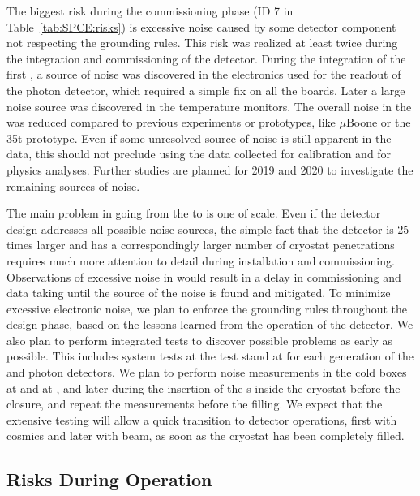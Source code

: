 The biggest risk during the commissioning phase
(ID 7 in Table~\ref{tab:SPCE:risks}) is excessive noise 
caused by some detector component not respecting the  grounding
rules. This risk was realized at least twice during the 
integration and commissioning of the  detector. During the 
integration of the first , a source of noise was discovered 
in the electronics used for the readout of the photon  detector, which 
required a simple fix on all the boards. Later a large noise source was 
discovered in the temperature monitors. The overall noise in the  
was reduced compared to previous  experiments or prototypes, 
like $\mu$Boone or the 35t prototype. Even if some unresolved source of noise 
is still apparent in the  data, this should not preclude using the
data collected for calibration and for physics analyses. Further studies are
planned for 2019 and 2020 to investigate the remaining sources of noise.

The main problem in going from the  to  is one of scale.
Even if the detector design addresses all possible noise sources, the simple
fact that the detector is 25 times larger and has a correspondingly larger
number of cryostat penetrations requires much more attention to detail
during installation and commissioning. Observations of excessive 
noise in  would result in a delay in commissioning and  
data taking until the source of the noise is found and mitigated. To minimize excessive 
electronic noise, we plan to enforce the grounding  rules throughout the 
design phase, based on the lessons learned from the operation of the 
 detector. We also plan to perform  integrated tests to discover 
possible problems as early as possible. This includes system tests at the  test stand at  for each generation 
of the  and photon detectors. We plan to perform noise 
measurements in the cold boxes at  and at , and later 
during the insertion of the s inside the cryostat before the 
 closure, and repeat the measurements before the  filling. 
We expect that the extensive testing will allow a quick transition to 
detector operations, first with cosmics and later with beam, as soon as the 
cryostat has been completely filled. 

\subsection{Risks During Operation}
\label{sec:fdsp-tpcelec-risks-operations}

